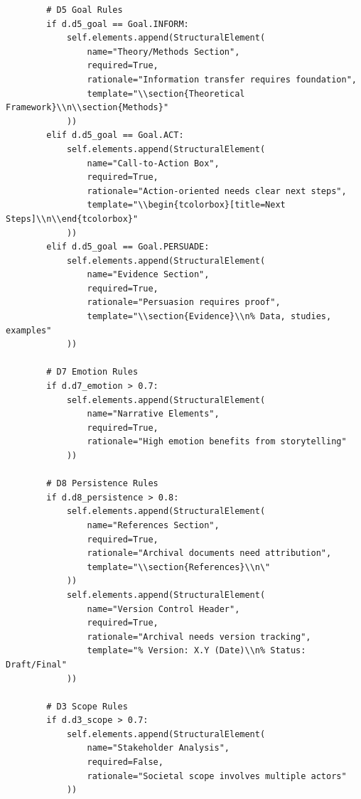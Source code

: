 \begin{verbatim}
        # D5 Goal Rules
        if d.d5_goal == Goal.INFORM:
            self.elements.append(StructuralElement(
                name="Theory/Methods Section",
                required=True,
                rationale="Information transfer requires foundation",
                template="\\section{Theoretical Framework}\\n\\section{Methods}"
            ))
        elif d.d5_goal == Goal.ACT:
            self.elements.append(StructuralElement(
                name="Call-to-Action Box",
                required=True,
                rationale="Action-oriented needs clear next steps",
                template="\\begin{tcolorbox}[title=Next Steps]\\n\\end{tcolorbox}"
            ))
        elif d.d5_goal == Goal.PERSUADE:
            self.elements.append(StructuralElement(
                name="Evidence Section",
                required=True,
                rationale="Persuasion requires proof",
                template="\\section{Evidence}\\n% Data, studies, examples"
            ))

        # D7 Emotion Rules
        if d.d7_emotion > 0.7:
            self.elements.append(StructuralElement(
                name="Narrative Elements",
                required=True,
                rationale="High emotion benefits from storytelling"
            ))

        # D8 Persistence Rules
        if d.d8_persistence > 0.8:
            self.elements.append(StructuralElement(
                name="References Section",
                required=True,
                rationale="Archival documents need attribution",
                template="\\section{References}\\n\"
            ))
            self.elements.append(StructuralElement(
                name="Version Control Header",
                required=True,
                rationale="Archival needs version tracking",
                template="% Version: X.Y (Date)\\n% Status: Draft/Final"
            ))

        # D3 Scope Rules
        if d.d3_scope > 0.7:
            self.elements.append(StructuralElement(
                name="Stakeholder Analysis",
                required=False,
                rationale="Societal scope involves multiple actors"
            ))


\end{verbatim}
